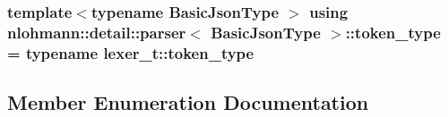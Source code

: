 \subsubsection[{\texorpdfstring{token\+\_\+type}{token_type}}]{\setlength{\rightskip}{0pt plus 5cm}template$<$typename Basic\+Json\+Type $>$ using {\bf nlohmann\+::detail\+::parser}$<$ Basic\+Json\+Type $>$\+::{\bf token\+\_\+type} =  typename {\bf lexer\+\_\+t\+::token\+\_\+type}\hspace{0.3cm}{\ttfamily [private]}}\hypertarget{classnlohmann_1_1detail_1_1parser_a21d247111b332785b7acf3f8e487d117}{}\label{classnlohmann_1_1detail_1_1parser_a21d247111b332785b7acf3f8e487d117}


\subsection{Member Enumeration Documentation}
